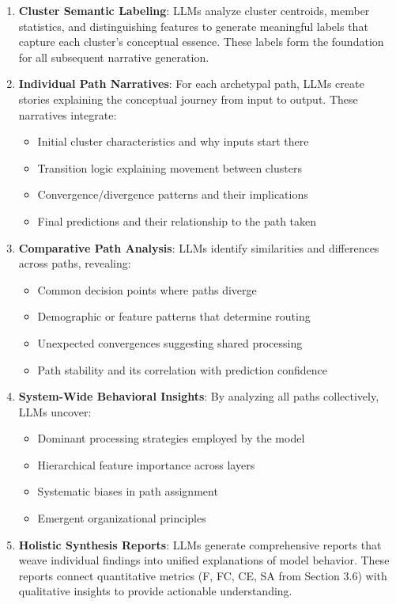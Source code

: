 \begin{enumerate}
    \item \textbf{Cluster Semantic Labeling}: LLMs analyze cluster centroids, member statistics, and distinguishing features to generate meaningful labels that capture each cluster's conceptual essence. These labels form the foundation for all subsequent narrative generation.
    
    \item \textbf{Individual Path Narratives}: For each archetypal path, LLMs create stories explaining the conceptual journey from input to output. These narratives integrate:
    \begin{itemize}
        \item Initial cluster characteristics and why inputs start there
        \item Transition logic explaining movement between clusters
        \item Convergence/divergence patterns and their implications
        \item Final predictions and their relationship to the path taken
    \end{itemize}
    
    \item \textbf{Comparative Path Analysis}: LLMs identify similarities and differences across paths, revealing:
    \begin{itemize}
        \item Common decision points where paths diverge
        \item Demographic or feature patterns that determine routing
        \item Unexpected convergences suggesting shared processing
        \item Path stability and its correlation with prediction confidence
    \end{itemize}
    
    \item \textbf{System-Wide Behavioral Insights}: By analyzing all paths collectively, LLMs uncover:
    \begin{itemize}
        \item Dominant processing strategies employed by the model
        \item Hierarchical feature importance across layers
        \item Systematic biases in path assignment
        \item Emergent organizational principles
    \end{itemize}
    
    \item \textbf{Holistic Synthesis Reports}: LLMs generate comprehensive reports that weave individual findings into unified explanations of model behavior. These reports connect quantitative metrics (F, FC, CE, SA from Section 3.6) with qualitative insights to provide actionable understanding.
\end{enumerate}

